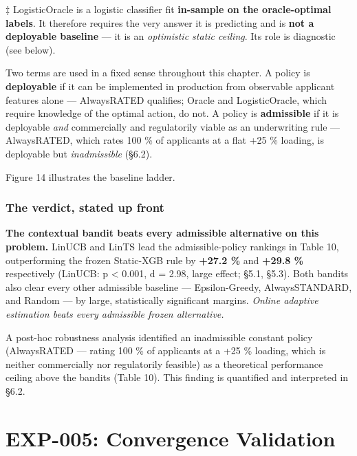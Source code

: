 ‡ LogisticOracle is a logistic classifier fit \textbf{in-sample on the oracle-optimal labels}. It therefore requires the very answer it is predicting and is \textbf{not a deployable baseline} --- it is an \emph{optimistic static ceiling}. Its role is diagnostic (see below).

Two terms are used in a fixed sense throughout this chapter. A policy is \textbf{deployable} if it can be implemented in production from observable applicant features alone --- AlwaysRATED qualifies; Oracle and LogisticOracle, which require knowledge of the optimal action, do not. A policy is \textbf{admissible} if it is deployable \emph{and} commercially and regulatorily viable as an underwriting rule --- AlwaysRATED, which rates 100 \% of applicants at a flat +25 \% loading, is deployable but \emph{inadmissible} (§6.2).

Figure 14 illustrates the baseline ladder.


\subsubsection{The verdict, stated up front}\label{the-verdict-stated-up-front}

\textbf{The contextual bandit beats every admissible alternative on this problem.} LinUCB and LinTS lead the admissible-policy rankings in Table 10, outperforming the frozen Static-XGB rule by \textbf{+27.2 \%} and \textbf{+29.8 \%} respectively (LinUCB: p \textless{} 0.001, d = 2.98, large effect; §5.1, §5.3). Both bandits also clear every other admissible baseline --- Epsilon-Greedy, AlwaysSTANDARD, and Random --- by large, statistically significant margins. \emph{Online adaptive estimation beats every admissible frozen alternative.}

A post-hoc robustness analysis identified an inadmissible constant policy (AlwaysRATED --- rating 100 \% of applicants at a +25 \% loading, which is neither commercially nor regulatorily feasible) as a theoretical performance ceiling above the bandits (Table 10). This finding is quantified and interpreted in §6.2.

\section{EXP-005: Convergence Validation}\label{exp-005-convergence-validation}

